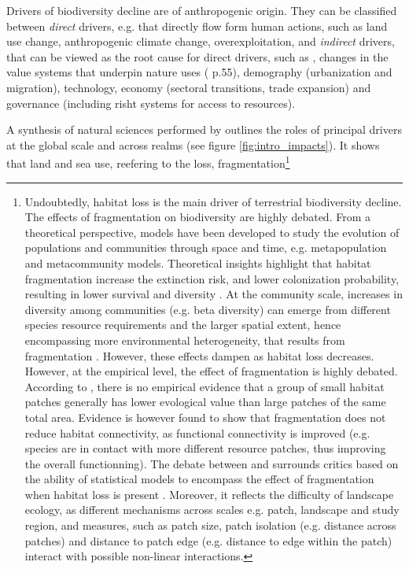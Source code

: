 Drivers of biodiversity decline are of anthropogenic origin. They can be classified between \textit{direct} drivers, e.g. that directly flow form human actions, such as land use change, anthropogenic climate change, overexploitation, and \textit{indirect} drivers, that can be viewed as the root cause for direct drivers, such as  , changes in the value systems that underpin nature uses (\cite{ipbes_2022_6417333} p.55), demography (urbanization and migration), technology, economy (sectoral transitions, trade expansion) and governance (including risht systems for access to resources).

A synthesis of natural sciences performed by \cite{ipbes_2022_6417333} outlines the roles of principal drivers at the global scale and across realms (see figure \ref{fig:intro_impacts}).
It shows that land and sea use, reefering to the loss, fragmentation\footnote{Undoubtedly, habitat loss is the main driver of terrestrial biodiversity decline. The effects of fragmentation on biodiversity are highly debated. From a theoretical perspective, models have been developed to study the evolution of populations and communities through space and time, e.g. metapopulation and metacommunity models. Theoretical insights highlight that habitat fragmentation increase the extinction risk, and lower colonization probability, resulting in lower survival and diversity \citep{adler_persistence_1994,hill_habitat_1999, thompson_loss_2017}. At the community scale, increases in diversity among communities (e.g. beta diversity) can emerge from different species resource requirements and the larger spatial extent, hence encompassing more environmental heterogeneity, that results from fragmentation \citep{lasky_reserve_2013, chisholm_species_2018}. However, these effects dampen as habitat loss decreases.  
However, at the empirical level, the effect of fragmentation is highly debated. According to \cite{fahrig_ecological_2017}, there is no empirical evidence that a group of small habitat patches generally has lower evological value than large patches of the same total area. Evidence is however found to show that fragmentation does not reduce habitat connectivity, as functional connectivity is improved (e.g. species are in contact with more different resource patches, thus improving the overall functionning). The debate between \citep{fletcher_is_2018} and \citep{fahrig_habitat_2019} surrounds critics based on the ability of statistical models to encompass the effect of fragmentation when habitat loss is present \citep{ruffell_accounting_2016}. Moreover, it reflects the difficulty of landscape ecology, as different mechanisms across scales e.g. patch, landscape and study region, and measures, such as patch size, patch isolation (e.g. distance across patches) and distance to patch edge (e.g. distance to edge within the patch) interact with possible non-linear interactions.}
